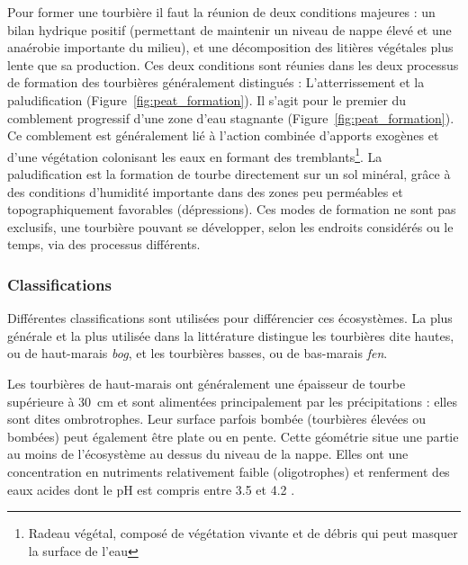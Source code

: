 Pour former une tourbière il faut la réunion de deux conditions majeures : un bilan hydrique positif (permettant de maintenir un niveau de nappe élevé et une anaérobie importante du milieu), et une décomposition des litières végétales plus lente que sa production.
Ces deux conditions sont réunies dans les deux processus de formation des tourbières généralement distingués : L'atterrissement et la paludification (Figure~\ref{fig:peat_formation}).
Il s'agit pour le premier du comblement progressif d'une zone d'eau stagnante (Figure~\ref{fig:peat_formation}).
Ce comblement est généralement lié à l'action combinée d'apports exogènes et d'une végétation colonisant les eaux en formant des tremblants\footnote{Radeau végétal, composé de végétation vivante et de débris qui peut masquer la surface de l'eau}.
La paludification est la formation de tourbe directement sur un sol minéral, grâce à des conditions d'humidité importante dans des zones peu perméables et topographiquement favorables (dépressions).
Ces modes de formation ne sont pas exclusifs, une tourbière pouvant se développer, selon les endroits considérés ou le temps, via des processus différents.

\subsubsection{Classifications}

Différentes classifications sont utilisées pour différencier ces écosystèmes.
La plus générale et la plus utilisée dans la littérature distingue les tourbières dite hautes, ou de haut-marais \textit{bog}, et les tourbières basses, ou de bas-marais \textit{fen}.

Les tourbières de haut-marais ont généralement une épaisseur de tourbe supérieure à \SI{30}{\cm} et sont alimentées principalement par les précipitations : elles sont dites ombrotrophes.
Leur surface parfois bombée (tourbières élevées ou bombées) peut également être plate ou en pente.
Cette géométrie situe une partie au moins de l'écosystème au dessus du niveau de la nappe.
Elles ont une concentration en nutriments relativement faible (oligotrophes) et renferment des eaux acides dont le pH est compris entre 3.5 et 4.2 \citep{rydin2013a}.

